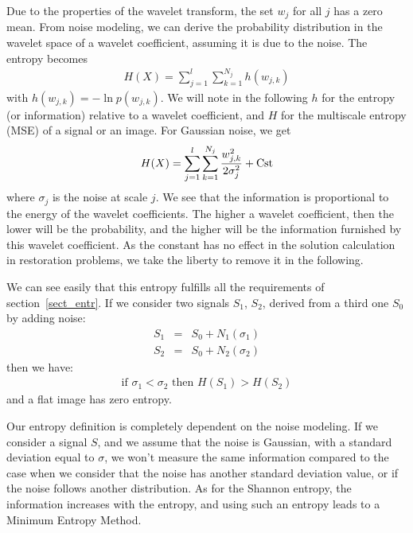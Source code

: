 Due to the properties of
the wavelet transform, the set $w_{j}$ for all $j$ has a zero mean. From 
noise modeling, we can derive the probability distribution in the 
wavelet space of a wavelet coefficient, assuming it is due to the noise. 
The entropy becomes
\begin{eqnarray}
H(X) = \sum_{j=1}^{l} \sum_{k=1}^{N_j}  h(w_{j,k}) 
\end{eqnarray}
with $h(w_{j,k})  = - \ln p(w_{j,k})$. We will note in the following 
$h$ for the entropy (or information) relative to a wavelet coefficient, 
and $H$ for the multiscale entropy (MSE) of a signal or an image.
For Gaussian noise, we get
\begin{eqnarray}
H(X) =  \sum_{j=1}^{l}  \sum_{k=1}^{N_j} \frac{w_{j,k}^2}{2 \sigma_j^2}+ \rm{Cst}
\end{eqnarray}
where $\sigma_j$ is the noise at scale $j$. We see that 
the information is proportional
to the energy of the wavelet coefficients.
The higher a wavelet coefficient, then the lower will be the  probability, and the 
higher will
be the information furnished by this wavelet coefficient. As the constant
has no effect in the solution calculation in restoration problems, 
we take the liberty to remove it in the following. 
 
We can see
easily that this entropy fulfills all the requirements of 
section~\ref{sect_entr}.
If we consider two signals $S_1$, $S_2$, derived from a third one $S_0$ by 
adding noise:
\begin{eqnarray}
S_1 & = & S_0 + N_1(\sigma_1) \nonumber \\ 
S_2 & = & S_0 + N_2(\sigma_2)
\end{eqnarray}
then we have:
\begin{eqnarray}
\mbox{if } \sigma_1 < \sigma_2 \mbox{ then } H(S_1) > H(S_2)
\end{eqnarray}
and a flat image has zero entropy. 

Our entropy definition is completely dependent on the noise modeling.
If we consider a signal $S$, and we assume that the noise is Gaussian, with 
a  standard deviation equal to $\sigma$, we won't measure the same
information compared to  the case when we consider that the noise has 
another standard deviation
value, or if the noise follows another distribution.
As for the Shannon
entropy, the information increases with the entropy, and using such an
entropy leads to a Minimum Entropy Method.

